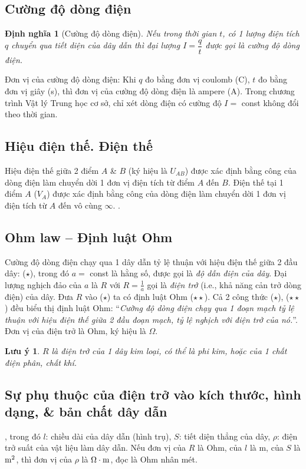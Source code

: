 \documentclass{article}
\newtheorem{dinhnghia}{Định nghĩa}
\newtheorem{luuy}{Lưu ý}
\begin{document}
\subsection{Cường độ dòng điện}

\begin{dinhnghia}[Cường độ dòng điện]
	Nếu trong thời gian $t$, có 1 lượng điện tích $q$ chuyển qua tiết diện của dây dẫn thì đại lượng $I = \dfrac{q}{t}$ được gọi là \emph{cường độ dòng điện}.
\end{dinhnghia}
Đơn vị của cường độ dòng điện: Khi $q$ đo bằng đơn vị coulomb (C), $t$ đo bằng đơn vị giây (s), thì đơn vị của cường độ dòng điện là ampere (A). Trong chương trình Vật lý Trung học cơ sở, chỉ xét dòng điện có cường độ $I =$ const không đổi theo thời gian.

\subsection{Hiệu điện thế. Điện thế}
Hiệu điện thế giữa 2 điểm $A$ \& $B$ (ký hiệu là $U_{AB}$) được xác định bằng công của dòng điện làm chuyển dời 1 đơn vị điện tích từ điểm $A$ đến $B$. Điện thế tại 1 điểm $A$ ($V_A$) được xác định bằng công của dòng điện làm chuyển dời 1 đơn vị điện tích từ $A$ đến vô cùng $\infty$. .

\subsection{Ohm law -- Định luật Ohm}
Cường độ dòng điện chạy qua 1 dây dẫn tỷ lệ thuận với hiệu điện thế giữa 2 đầu dây:  ($\star$), trong đó $a =$ const là hằng số, được gọi là \emph{độ dẫn điện của dây}. Đại lượng nghịch đảo của $a$ là $R$ với $R = \frac{1}{a}$ gọi là \textit{điện trở} (i.e., khả năng cản trở dòng điện) của dây. Đưa $R$ vào ($\star$) ta có định luật Ohm  ($\star\star$). Cả 2 công thức ($\star$), ($\star\star$) đều biểu thị định luật Ohm: ``\textit{Cường độ dòng điện chạy qua 1 đoạn mạch tỷ lệ thuận với hiệu điện thế giữa 2 đầu đoạn mạch, tỷ lệ nghịch với điện trở của nó.}''. Đơn vị của điện trở là Ohm, ký hiệu là $\Omega$.

\begin{luuy}
	$R$ là điện trở của 1 dây kim loại, có thể là phi kim, hoặc của 1 chất điện phân, chất khí.
\end{luuy}

\subsection{Sự phụ thuộc của điện trở vào kích thước, hình dạng, \& bản chất dây dẫn}
, trong đó $l$: chiều dài của dây dẫn (hình trụ), $S$: tiết diện thẳng của dây, $\rho$: điện trở suất của vật liệu làm dây dẫn. Nếu đơn vị của $R$ là Ohm, của $l$ là m, của $S$ là $\rm m^2$, thì đơn vị của $\rho$ là $\rm\Omega\cdot m$, đọc là Ohm nhân mét.
\end{document}
